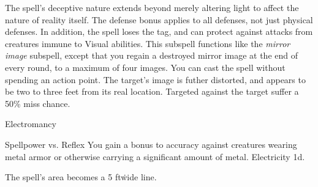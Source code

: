 The spell's deceptive nature extends beyond merely altering light to affect the nature of reality itself.
The defense bonus applies to all defenses, not just physical defenses.
In addition, the spell loses the  tag, and can protect against attacks from creatures immune to Visual abilities.
This subspell functions like the \textit{mirror image} subspell, except that you regain a destroyed mirror image at the end of every round, to a maximum of four images.
You can cast the spell without spending an action point.
The target's image is futher distorted, and appears to be two to three feet from its real location.
Targeted  against the target suffer a 50\% miss chance.
\begin{spellsection}{Electromancy}
\begin{spellheader}
\end{spellheader}
\begin{spellcontent}
\begin{spelltargetinginfo}
\end{spelltargetinginfo}
\begin{spelleffects}
\begin{spellattack}{Spellpower vs. Reflex}
\spellspecial You gain a  bonus to accuracy against creatures wearing metal armor or otherwise carrying a significant amount of metal.
\spellsuccess
Electricity  \minus1d.
\end{spellattack}
\end{spelleffects}
\end{spellcontent}
\begin{spellfooter}
\end{spellfooter}
\begin{spellsubcontent}
\begin{spellcantrip}
The spell's area becomes a 5 ft\. wide \areamed line.
\end{spellcantrip}
\end{spellsubcontent}
\end{spellsection}
